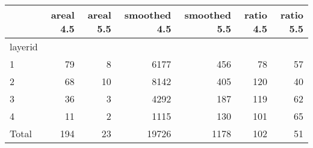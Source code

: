 \begin{tabular}{lrrrrrr}
\toprule
{} &  areal 4.5 &  areal 5.5 &  smoothed 4.5 &  smoothed 5.5 &  ratio 4.5 &  ratio 5.5 \\
\midrule
layerid &            &            &               &               &            &            \\
1       &         79 &          8 &          6177 &           456 &         78 &         57 \\
2       &         68 &         10 &          8142 &           405 &        120 &         40 \\
3       &         36 &          3 &          4292 &           187 &        119 &         62 \\
4       &         11 &          2 &          1115 &           130 &        101 &         65 \\
Total   &        194 &         23 &         19726 &          1178 &        102 &         51 \\
\bottomrule
\end{tabular}
